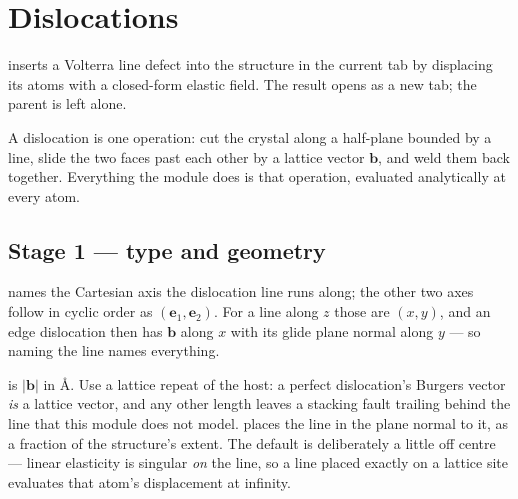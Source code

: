 \section{Dislocations}
\label{sec:dislocations}

\menusep{} inserts a Volterra line defect into
the structure in the current tab by displacing its atoms with a
closed-form elastic field. The result opens as a new tab; the parent is
left alone.

A dislocation is one operation: cut the crystal along a half-plane bounded
by a line, slide the two faces past each other by a lattice vector
$\mathbf{b}$, and weld them back together. Everything the module does is
that operation, evaluated analytically at every atom.

\subsection{Stage 1 --- type and geometry}

 names the Cartesian axis the dislocation line runs
along; the other two axes follow in cyclic order as $(\mathbf{e}_1,
\mathbf{e}_2)$. For a line along $z$ those are $(x, y)$, and an edge
dislocation then has $\mathbf{b}$ along $x$ with its glide plane normal
along $y$ --- so naming the line names everything.

 is $|\mathbf{b}|$ in \AA{}. Use a lattice repeat of
the host: a perfect dislocation's Burgers vector \emph{is} a lattice
vector, and any other length leaves a stacking fault trailing behind the
line that this module does not model.  places the line
in the plane normal to it, as a fraction of the structure's extent. The
default is deliberately a little off centre --- linear elasticity is
singular \emph{on} the line, so a line placed exactly on a lattice site
evaluates that atom's displacement at infinity.

